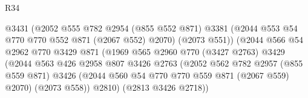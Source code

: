\begin{lexlean}{R34}
\begin{coremodule}
                                          @3431
                                          (@2052
                                            @555
                                            @782
                                            @2954
                                            (@855 @552 @871)
                                            @3381
                                            (@2044 @553 @54 @770 @770 @552 @871 (@2067 @552) @2070)
                                            (@2073 @551))
                                          (@2044
                                            @566
                                            @54
                                            @2962
                                            @770
                                            @3429
                                            @871
                                            (@1969
                                              @565
                                              @2960
                                              @770
                                              (@3427 @2763)
                                              @3429
                                              (@2044
                                                @563
                                                @426
                                                @2958
                                                @807
                                                @3426
                                                @2763
                                                (@2052
                                                  @562
                                                  @782
                                                  @2957
                                                  (@855 @559 @871)
                                                  @3426
                                                  (@2044
                                                    @560
                                                    @54
                                                    @770
                                                    @770
                                                    @559
                                                    @871
                                                    (@2067 @559)
                                                    @2070)
                                                  (@2073 @558))
                                                @2810)
                                              (@2813 @3426 @2718))

\end{coremodule}
\end{lexlean}
